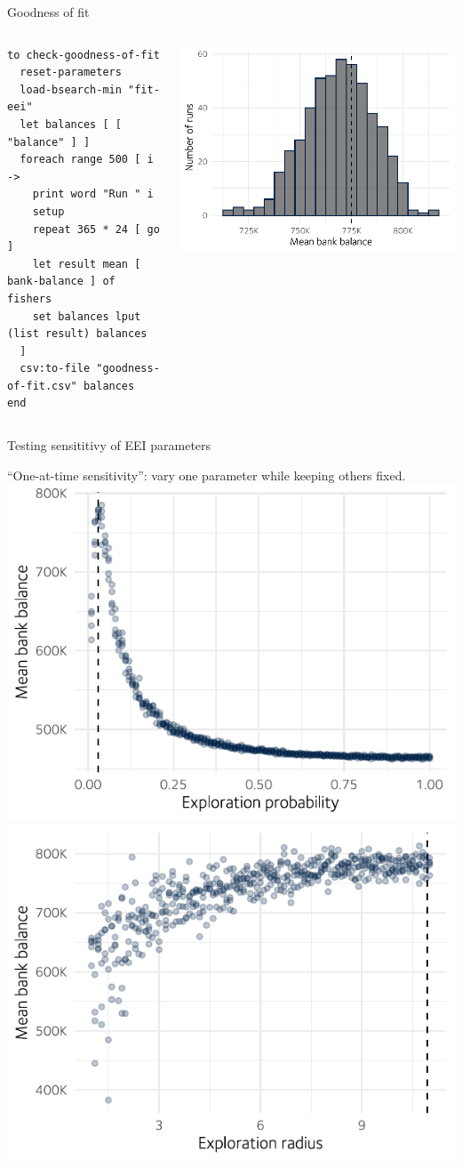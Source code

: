 \documentclass[table, 14pt, aspectratio=169]{beamer}
\begin{document}
\begin{frame}[fragile]{Goodness of fit}
  \begin{columns}
    \vskip15mm
    \begin{verbatim}  
to check-goodness-of-fit
  reset-parameters
  load-bsearch-min "fit-eei"
  let balances [ [ "balance" ] ]
  foreach range 500 [ i ->
    print word "Run " i
    setup
    repeat 365 * 24 [ go ]
    let result mean [ bank-balance ] of fishers
    set balances lput (list result) balances 
  ]
  csv:to-file "goodness-of-fit.csv" balances 
end
    \end{verbatim}
    \vskip-35mm
    \includegraphics[width=\linewidth]{images/goodness_of_fit.pdf}
  \end{columns}
\end{frame}


\begin{frame}{Testing sensititivy of EEI parameters}
  \par
  {\small ``One-at-time sensitivity'': vary one parameter while keeping others fixed.}
  \vfill
  \includegraphics[width=0.49\linewidth]{images/exploration_prob.pdf}
  \hfill
  \includegraphics[width=0.49\linewidth]{images/exploration_radius.pdf}
  \vfill
\end{frame}
\end{document}
